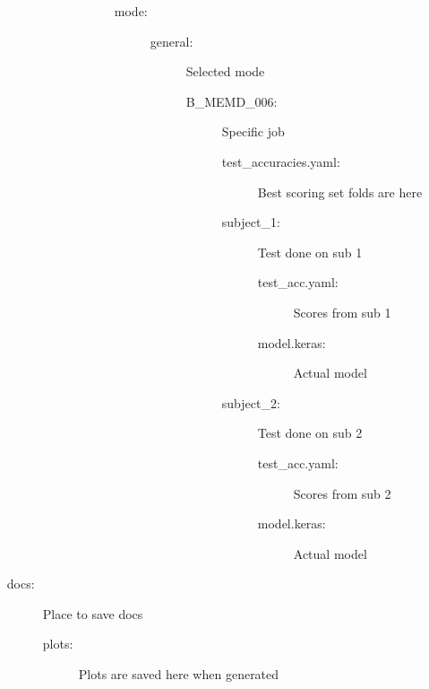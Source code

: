 \begin{footnotesize}
\begin{itemize}[label={}, leftmargin=*]
\begin{description}
\begin{description}
\begin{description}
                    \begin{description}
                    \item [mode:]
                        \begin{description}
                        \item [general:] Selected mode
                            \begin{description}
                            \item [B\_MEMD\_006:] Specific job
                                \begin{description}
                                \item [test\_accuracies.yaml:] Best scoring set folds are here
                                \item [subject\_1:] Test done on sub 1
                                    \begin{description}
                                    \item [test\_acc.yaml:] Scores from sub 1
                                    \item [model.keras:] Actual model
                                    \end{description}
                                \item [subject\_2:] Test done on sub 2
                                    \begin{description}
                                    \item [test\_acc.yaml:] Scores from sub 2
                                    \item [model.keras:] Actual model       
                                    \end{description}
                                \end{description}
                            \end{description}
                        \end{description}
                    \end{description}
                \end{description}
            \end{description}
        \item [docs:] Place to save docs
            \begin{description}
            \item [plots:] Plots are saved here when generated
                \begin{description}

\end{description}
\end{description}
\end{description}
\end{itemize}
\end{footnotesize}
